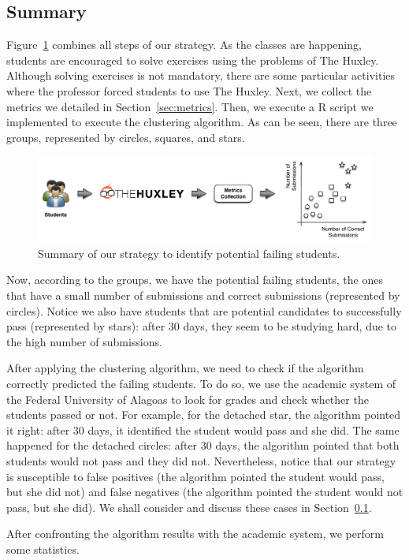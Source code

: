\subsection{Summary}

Figure~\ref{fig:strategy} combines all steps of our strategy. As the classes are happening, students are encouraged to solve exercises using the problems of The Huxley. Although solving exercises is not mandatory, there are some particular activities where the professor forced students to use The Huxley. Next, we collect the metrics we detailed in Section~\ref{sec:metrics}. Then, we execute a R script we implemented to execute the clustering algorithm. As can be seen, there are three groups, represented by circles, squares, and stars. 

\begin{figure}[htb]
\centering
\includegraphics[width=1.0\textwidth,natwidth=610,natheight=642]{images/Strategy.pdf}
\caption{Summary of our strategy to identify potential failing students.}
\label{fig:strategy}
\end{figure}

Now, according to the groups, we have the potential failing students, the ones that have a small number of submissions and correct submissions (represented by circles). Notice we also have students that are potential candidates to successfully pass (represented by stars): after 30 days, they seem to be studying hard, due to the high number of submissions.

After applying the clustering algorithm, we need to check if the algorithm correctly predicted the failing students. To do so, we use the academic system of the Federal University of Alagoas to look for grades and check whether the students passed or not. For example, for the detached star, the algorithm pointed it right: after 30 days, it identified the student would pass and she did. The same happened for the detached circles: after 30 days, the algorithm pointed that both students would not pass and they did not. Nevertheless, notice that our strategy is susceptible to false positives (the algorithm pointed the student would pass, but she did not) and false negatives (the algorithm pointed the student would not pass, but she did). We shall consider and discuss these cases in Section~\ref{}.

After confronting the algorithm results with the academic system, we perform some statistics.

